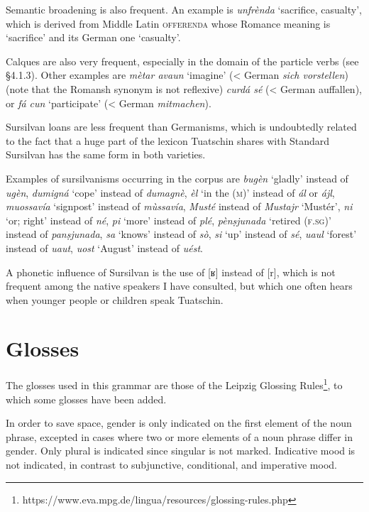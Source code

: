 Semantic broadening is also frequent. An example is \textit{unfrènda} `sacrifice, casualty', which is derived from Middle Latin \textsc{offerenda} \citep[1283]{Decurtins2012} whose Romance meaning is `sacrifice' and its German one `casualty'.

Calques are also very frequent, especially in the domain of the particle verbs (see §4.1.3). Other examples are \textit{mètar avaun} `imagine' (< German \textit{sich vorstellen}) (note that the Romansh synonym is not reflexive) \textit{curdá sé} (< German auffallen), or \textit{fá cun} `participate' (< German \textit{mitmachen}).

Sursilvan loans are less frequent than Germanisms, which is undoubtedly related to the fact that a huge part of the lexicon Tuatschin shares with Standard Sursilvan has the same form in both varieties.

Examples of sursilvanisms occurring in the corpus are \textit{bugèn} `gladly' instead of \textit{ugèn}, \textit{dumigná} `cope' instead of \textit{dumagnè},  \textit{èl} `in the (\textsc{m})' instead of \textit{ál} or \textit{ájl}, \textit{muossavía} `signpost' instead of \textit{mùssavía}, \textit{Musté} instead of \textit{Mustajr} `Mustér', \textit{ni} `or; right' instead of \textit{né}, \textit{pi} `more' instead of \textit{plé}, \textit{pènṣjunada} `retired (\textsc{f.sg})' instead of \textit{panṣjunada}, \textit{sa} `knows' instead of \textit{sò}, \textit{si} `up' instead of \textit{sé}, \textit{uaul} `forest' instead of \textit{uaut}, \textit{uost} `August' instead of \textit{uést}.

A phonetic influence of Sursilvan is the use of [ʁ] instead of [r], which is not frequent among the native speakers I have consulted, but which one often hears when younger people or children speak Tuatschin.



\section{Glosses}
The glosses used in this grammar are those of the Leipzig Glossing Rules\footnote{https://www.eva.mpg.de/lingua/resources/glossing-rules.php}, to which some glosses have been added.

In order to save space, gender is only indicated on the first element of the noun phrase, excepted in cases where two or more elements of a noun phrase differ in gender. Only plural is indicated since singular is not marked. Indicative mood is not indicated, in contrast to subjunctive, conditional, and imperative mood.

